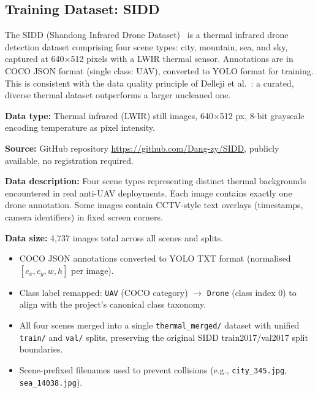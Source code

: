 \documentclass[12pt,a4paper]{report}
\begin{document}
\subsection{Training Dataset: SIDD}

The SIDD (Shandong Infrared Drone Dataset)~\cite{sidd2023} is a thermal
infrared drone detection dataset comprising four scene types: city, mountain,
sea, and sky, captured at 640$\times$512 pixels with a LWIR thermal sensor.
Annotations are in COCO JSON format (single class: UAV), converted to YOLO
format for training. This is consistent with the data quality principle of
Delleji et al.~\cite{delleji2025thermal}: a curated, diverse thermal dataset
outperforms a larger uncleaned one.

\textbf{Data type:} Thermal infrared (LWIR) still images, 640$\times$512 px,
8-bit grayscale encoding temperature as pixel intensity.

\textbf{Source:} GitHub repository \url{https://github.com/Dang-zy/SIDD},
publicly available, no registration required.

\textbf{Data description:} Four scene types representing distinct thermal
backgrounds encountered in real anti-UAV deployments. Each image contains
exactly one drone annotation. Some images contain CCTV-style text overlays
(timestamps, camera identifiers) in fixed screen corners.

\textbf{Data size:} 4,737 images total across all scenes and splits.

\begin{itemize}
  \item COCO JSON annotations converted to YOLO TXT format
        (normalised $[c_x, c_y, w, h]$ per image).
  \item Class label remapped: \texttt{UAV} (COCO category) $\to$
        \texttt{Drone} (class index 0) to align with the project's
        canonical class taxonomy.
  \item All four scenes merged into a single \texttt{thermal\_merged/}
        dataset with unified \texttt{train/} and \texttt{val/} splits,
        preserving the original SIDD train2017/val2017 split boundaries.
  \item Scene-prefixed filenames used to prevent collisions
        (e.g., \texttt{city\_345.jpg}, \texttt{sea\_14038.jpg}).
\end{itemize}
\end{document}
